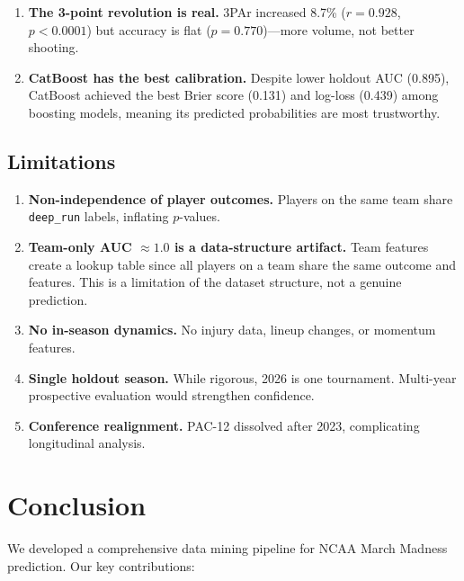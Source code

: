 \documentclass[12pt, a4paper]{article}
\begin{document}
\begin{enumerate}
    \item \textbf{The 3-point revolution is real.} 3PAr increased 8.7\% ($r = 0.928$, $p < 0.0001$) but accuracy is flat ($p = 0.770$)---more volume, not better shooting.

    \item \textbf{CatBoost has the best calibration.} Despite lower holdout AUC (0.895), CatBoost achieved the best Brier score (0.131) and log-loss (0.439) among boosting models, meaning its predicted probabilities are most trustworthy.
\end{enumerate}

\subsection{Limitations}

\begin{enumerate}
    \item \textbf{Non-independence of player outcomes.} Players on the same team share \texttt{deep\_run} labels, inflating $p$-values.
    \item \textbf{Team-only AUC $\approx 1.0$ is a data-structure artifact.} Team features create a lookup table since all players on a team share the same outcome and features. This is a limitation of the dataset structure, not a genuine prediction.
    \item \textbf{No in-season dynamics.} No injury data, lineup changes, or momentum features.
    \item \textbf{Single holdout season.} While rigorous, 2026 is one tournament. Multi-year prospective evaluation would strengthen confidence.
    \item \textbf{Conference realignment.} PAC-12 dissolved after 2023, complicating longitudinal analysis.
\end{enumerate}

\section{Conclusion}
\label{sec:conclusion}

We developed a comprehensive data mining pipeline for NCAA March Madness prediction. Our key contributions:
\end{document}
